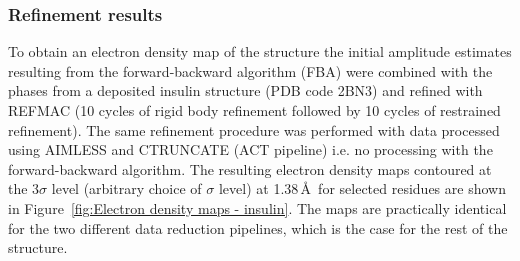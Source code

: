 \subsubsection{Refinement results}
\label{subs:Refinement results - insulin}
To obtain an electron density map of the structure the initial amplitude estimates resulting from the forward-backward algorithm (FBA) were combined with the phases from a deposited insulin structure (PDB code 2BN3) and refined with REFMAC \cite{murshudov2011refmac5} (10 cycles of rigid body refinement followed by 10 cycles of restrained refinement).
The same refinement procedure was performed with data processed using AIMLESS \cite{evans2013} and CTRUNCATE (ACT pipeline) \cite{winn2011} i.e. no processing with the forward-backward algorithm.
The resulting electron density maps contoured at the 3$\sigma$ level (arbitrary choice of $\sigma$ level) at 1.38$\,$\AA\ for selected residues are shown in Figure~\ref{fig:Electron density maps - insulin}.
The maps are practically identical for the two different data reduction pipelines, which is the case for the rest of the structure.

